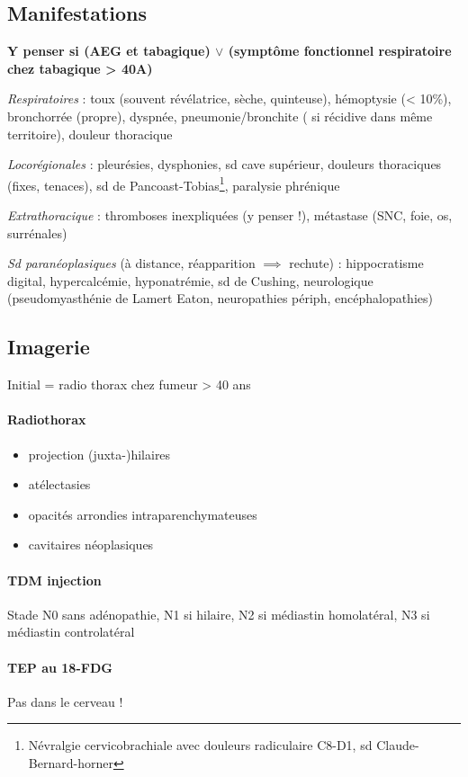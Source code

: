 \documentclass{article}
\begin{document}
\subsection{Manifestations}
\textbf{Y penser si (AEG et tabagique) $\vee$ (symptôme fonctionnel respiratoire
  chez tabagique > 40A)}

\textit{Respiratoires}  : toux (souvent révélatrice, sèche, quinteuse), hémoptysie (<
10\%), bronchorrée (propre), dyspnée, pneumonie/bronchite (\danger{} si récidive
dans même territoire), douleur thoracique 

\textit{Locorégionales}  : pleurésies, dysphonies, sd cave supérieur, douleurs thoraciques
(fixes, tenaces), sd de Pancoast-Tobias\footnote{Névralgie cervicobrachiale avec
  douleurs radiculaire C8-D1, sd Claude-Bernard-horner}, paralysie phrénique

\textit{Extrathoracique}  : thromboses inexpliquées (y penser !), métastase (SNC,
foie, os, surrénales)

\textit{Sd paranéoplasiques} (à distance, réapparition $\implies$ rechute) :
hippocratisme digital, hypercalcémie, hyponatrémie, sd de Cushing, neurologique
(pseudomyasthénie de Lamert Eaton, neuropathies périph, encéphalopathies)

\subsection{Imagerie}
Initial = radio thorax chez fumeur > 40 ans
\paragraph{Radiothorax}
\begin{itemize}
\item projection (juxta-)hilaires
\item atélectasies
\item opacités arrondies intraparenchymateuses
\item cavitaires néoplasiques
\end{itemize}

\paragraph{TDM injection}
Stade N0 sans adénopathie, N1 si hilaire, N2 si médiastin homolatéral, N3 si médiastin
controlatéral

\paragraph{TEP au 18-FDG}
Pas dans le cerveau !
\end{document}

